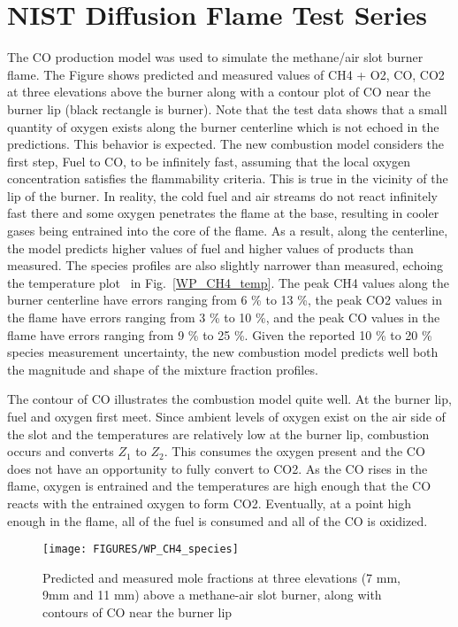 \clearpage

\section{NIST Diffusion Flame Test Series}

The CO production model was used to simulate the methane/air slot burner flame.  The Figure shows predicted and 
measured values of CH4 + O2, CO,  CO2 at three elevations above the burner along with a contour plot of CO near the 
burner lip (black rectangle is burner).  Note that the test data shows that a small quantity of oxygen exists along 
the burner centerline which is not echoed in the predictions.  This behavior is expected. The new combustion model considers 
the first step, Fuel to CO, to be infinitely fast, assuming that the local oxygen concentration satisfies the 
flammability criteria.  This is true in the vicinity of the lip of the burner.  In reality, the cold fuel and air 
streams do not react infinitely fast there and some oxygen penetrates the flame at the base, resulting in cooler 
gases being entrained into the core of the flame.  As a result, along the centerline, the model predicts higher values of fuel and higher values of 
products than measured.  The species profiles are also slightly narrower than measured, echoing the temperature plot \
in Fig.~\ref{WP_CH4_temp}.  The peak CH4 values along the burner centerline have errors ranging from 6 \% to 13 \%, 
the peak CO2 values in the flame have errors ranging from 3 \% to 10 \%, and the peak CO values in the flame have 
errors ranging from 9 \% to 25 \%.  Given the reported 10 \% to 20 \% species measurement uncertainty, the new 
combustion model predicts well both the magnitude and shape of the mixture fraction profiles.

The contour of CO illustrates the combustion model quite well.  At the burner lip, fuel and oxygen first meet.  
Since ambient levels of oxygen exist on the air side of the slot and the temperatures are relatively low at the 
burner lip, combustion occurs and converts $Z_1$ to $Z_2$.  This consumes the oxygen present and the CO does not have an 
opportunity to fully convert to CO2.  As the CO rises in the flame, oxygen is entrained and the temperatures are high 
enough that the CO reacts with the entrained oxygen to form CO2.  Eventually, at a point high enough in the flame, 
all of the fuel is consumed and all of the CO is oxidized.

\begin{figure}[p]
\texttt{[image: FIGURES/WP\_CH4\_species]}
\caption{Predicted and measured mole fractions at three elevations (7 mm, 9mm and 11 mm) above a methane-air slot burner, 
along with contours of CO near the burner lip}
\label{WP_CH4_Species}
\end{figure}
